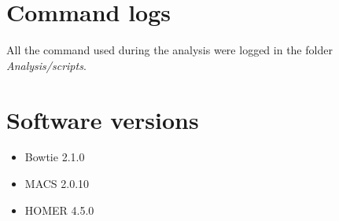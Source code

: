 \documentclass[12pt]{article}
\begin{document}
\section{Command logs}

All the command used during the analysis were logged in the folder \emph{Analysis/scripts}.

\clearpage
\appendix
\appendixpage
\addappheadtotoc

\section{Software versions}
\begin{itemize}
\item Bowtie 2.1.0
\item MACS 2.0.10
\item HOMER 4.5.0
\end{itemize}

\clearpage


\end{document}
